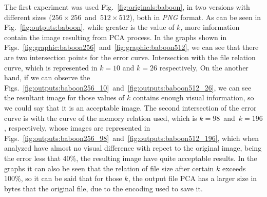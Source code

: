 \documentclass[journal]{IEEEtran}
\begin{document}

The first experiment was used Fig.~\ref{fig:originals:baboon}, in two versions with different sizes ($256\times 256$~and~$512\times 512$), both in \textit{PNG} format. As can be seen in Fig.~\ref{fig:outputs:baboon}, while greater is the value of $k$, more information contain the image resulting from PCA process. 
In the graphs shown in Figs.~\ref{fig:graphic:baboon256}~and~\ref{fig:graphic:baboon512}, we can see that there are two intersection points for the error curve. Intersection with the file relation curve, which is represented in $k=10$ and $k=26$ respectively, On the another hand, if we can observe the Figs.~\ref{fig:outputs:baboon256_10}~and~\ref{fig:outputs:baboon512_26}, we can see the resultant image for those values of $k$ contains enough visual information, so we could say that it is an acceptable image. The second  intersection of the error curve is with the curve of the memory relation used, which is $k=98$~and~$k=196$, respectively, whose images are represented in Figs.~\ref{fig:outputs:baboon256_98}~and~\ref{fig:outputs:baboon512_196}, which when analyzed have almost no visual difference with repect to the original image, being the error less that 40\%, the resulting image have quite acceptable results.
In the graphs it can also be seen that the relation of file size after certain $k$ exceeds 100\%, so it can be said that for those $k$, the output file PCA has a larger size in bytes that the original file, due to the encoding used to save it.
\end{document}
